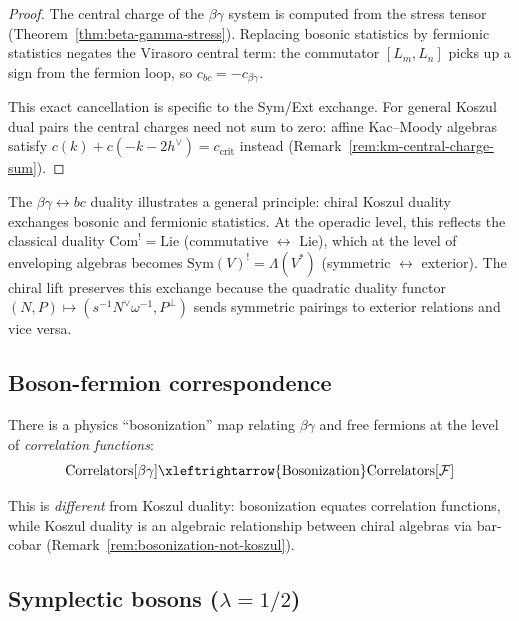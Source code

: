 \begin{proof}
The central charge of the $\beta\gamma$ system is computed from the stress tensor (Theorem~\ref{thm:beta-gamma-stress}). Replacing bosonic statistics by fermionic statistics negates the Virasoro central term: the commutator $[L_m, L_n]$ picks up a sign from the fermion loop, so $c_{bc} = -c_{\beta\gamma}$.

This exact cancellation is specific to the Sym/Ext exchange.
For general Koszul dual pairs the central charges need not sum to zero:
affine Kac--Moody algebras satisfy
$c(k) + c(-k-2h^\vee) = c_{\mathrm{crit}}$ instead
(Remark~\ref{rem:km-central-charge-sum}).
\end{proof}

\begin{remark}\label{rem:statistics-exchange}
The $\beta\gamma \leftrightarrow bc$ duality illustrates a general principle: chiral Koszul duality exchanges bosonic and fermionic statistics. At the operadic level, this reflects the classical duality $\mathrm{Com}^! = \mathrm{Lie}$ (commutative $\leftrightarrow$ Lie), which at the level of enveloping algebras becomes $\mathrm{Sym}(V)^! = \Lambda(V^*)$ (symmetric $\leftrightarrow$ exterior). The chiral lift preserves this exchange because the quadratic duality functor $(N, P) \mapsto (s^{-1}N^\vee\omega^{-1}, P^\perp)$ sends symmetric pairings to exterior relations and vice versa.
\end{remark}

\subsection{Boson-fermion correspondence}

\begin{theorem}
\label{thm:physical-bosonization}
There is a physics ``bosonization'' map relating $\beta\gamma$ and free fermions at the level of
\emph{correlation functions}:
\[\text{Correlators}[\beta\gamma] \xleftrightarrow{\text{Bosonization}} \text{Correlators}[\mathcal{F}]\]

This is \emph{different} from Koszul duality: bosonization equates correlation functions, while Koszul duality is an algebraic relationship between chiral algebras via bar-cobar
(Remark~\ref{rem:bosonization-not-koszul}).
\end{theorem}

\subsection{\texorpdfstring{Symplectic bosons ($\lambda = 1/2$)}{Symplectic bosons ( = 1/2)}}

